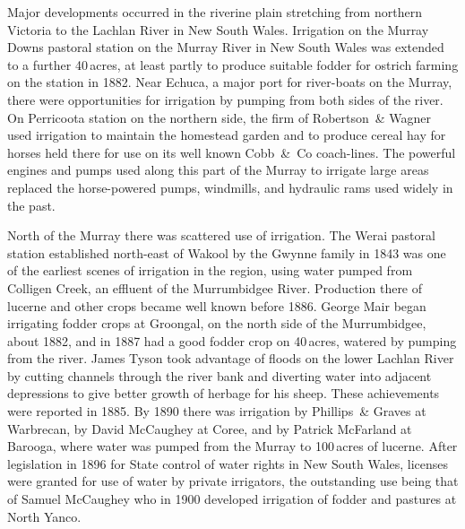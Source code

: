 Major developments occurred in the riverine plain stretching from
northern Victoria to the Lachlan River  in New
South Wales.  Irrigation on the Murray Downs pastoral station
 on the
Murray River  in New South Wales was extended to a
further 40\,acres, at least partly to produce suitable fodder for
ostrich farming on the station in 1882. Near Echuca,  a major port for river-boats on the Murray, there were
opportunities for irrigation by pumping from both sides of the river.
On Perricoota station  on the northern side,
the firm of Robertson~\& Wagner used irrigation to maintain the
homestead garden and to produce cereal hay for horses held there for
use on its well known Cobb~\&~Co   coach-lines. The
powerful engines and pumps used along this part of the Murray to
irrigate large areas replaced the horse-powered pumps,
 windmills, and hydraulic rams used widely
in the past.

North of the Murray there was scattered use of irrigation.  The Werai
pastoral station  established north-east of
Wakool  by the Gwynne family in 1843 was one of the
earliest scenes of irrigation in the region, using water pumped from
Colligen Creek,  an effluent of the Murrumbidgee
River.   Production there of lucerne
 and
other crops became well known before 1886.  George Mair  began irrigating fodder crops at Groongal, 
on the north side of the Murrumbidgee, about 1882, and in 1887 had a
good fodder crop on 40\,acres, watered by pumping from the river.
James Tyson
took advantage of floods on the lower Lachlan River
 by cutting
channels through the river bank and diverting water into adjacent
depressions to give better growth of herbage for his sheep. These
achievements were reported in 1885.  By 1890 there was irrigation by
Phillips~\& Graves at Warbrecan,  by David McCaughey
at Coree,  and by Patrick McFarland
  at Barooga,  where water
was pumped from the Murray to 100\,acres of lucerne.  After
legislation in 1896 for State control of water rights in New South
Wales, licenses were granted for use of water by private irrigators,
the outstanding use being that of Samuel McCaughey  who in 1900 developed irrigation of fodder and pastures at North
Yanco. 

